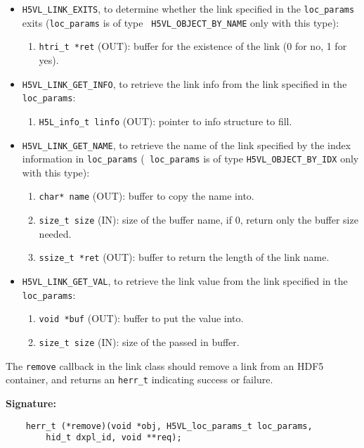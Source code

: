 \begin{itemize}
\item {\tt H5VL\_LINK\_EXITS}, to determine whether the link specified
  in the {\tt loc\_params} exits ({\tt loc\_params} is of type {\tt
    H5VL\_OBJECT\_BY\_NAME} only with this type):
  \begin{enumerate}
  \item {\tt htri\_t *ret} (OUT): buffer for the existence of the link
    (0 for no, 1 for yes).
  \end{enumerate}

\item {\tt H5VL\_LINK\_GET\_INFO}, to retrieve the link info from the
  link specified in the {\tt loc\_params}:
  \begin{enumerate}
  \item {\tt H5L\_info\_t linfo} (OUT): pointer to info structure to
    fill.
  \end{enumerate}

\item {\tt H5VL\_LINK\_GET\_NAME}, to retrieve the name of the link
  specified by the index information in {\tt loc\_params} ({\tt
    loc\_params} is of type {\tt H5VL\_OBJECT\_BY\_IDX} only with this
  type):
  \begin{enumerate}
  \item {\tt char* name} (OUT): buffer to copy the name into.
  \item {\tt size\_t size} (IN): size of the buffer name, if 0, return
    only the buffer size needed.
  \item {\tt ssize\_t *ret} (OUT): buffer to return the length of the
    link name.
  \end{enumerate}

\item {\tt H5VL\_LINK\_GET\_VAL}, to retrieve the link value from the
  link specified in the {\tt loc\_params}:
  \begin{enumerate}
  \item {\tt void *buf} (OUT): buffer to put the value into.
  \item {\tt size\_t size} (IN): size of the passed in buffer.
  \end{enumerate}

\end{itemize}

The {\tt remove} callback in the link class should remove a link from
an HDF5 container, and returns an {\tt herr\_t} indicating success or
failure.

\textbf{Signature:}
\begin{lstlisting}
    herr_t (*remove)(void *obj, H5VL_loc_params_t loc_params, 
        hid_t dxpl_id, void **req);
\end{lstlisting}

